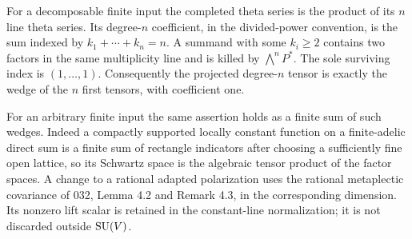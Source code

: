 \documentclass[11pt]{article}
\theoremstyle{definition}\newtheorem{definition}[theorem]{Definition}\newtheorem{remark}[theorem]{Remark}
\begin{document}
For a decomposable finite input the completed theta series is the
product of its $n$ line theta series. Its degree-$n$ coefficient,
in the divided-power convention, is the sum indexed by
$k_1+\cdots+k_n=n$. A summand with some $k_i\geq2$ contains
two factors in the same multiplicity line and is killed by
$\bigwedge^nP^*$. The sole surviving index is $(1,\ldots,1)$.
Consequently the projected degree-$n$ tensor is exactly the wedge
of the $n$ first tensors, with coefficient one.

For an arbitrary finite input the same assertion holds as a finite
sum of such wedges. Indeed a compactly supported locally constant
function on a finite-adelic direct sum is a finite sum of rectangle
indicators after choosing a sufficiently fine open lattice, so its
Schwartz space is the algebraic tensor product of the factor spaces.
A change to a rational adapted polarization uses the rational
metaplectic covariance of 032, Lemma 4.2 and Remark 4.3, in the
corresponding dimension. Its nonzero lift scalar is retained in the
constant-line normalization; it is not discarded outside $\operatorname{SU}(V)$.
\end{document}
